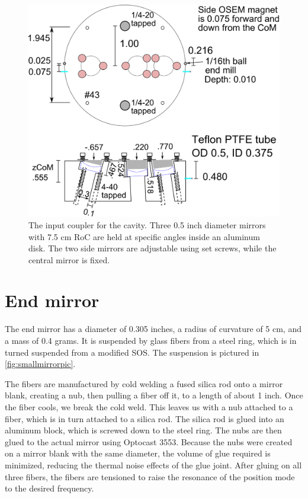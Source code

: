 \begin{figure}[hp]
	\centering
		\includegraphics[width=.9\textwidth]{figures/suspensions/inputcoupler.png}
	\caption[Input coupler]{The input coupler for the cavity. Three 0.5 inch diameter mirrors with 7.5 cm RoC are held at specific angles inside an aluminum disk. The two side mirrors are adjustable using set screws, while the central mirror is fixed.}
	\label{fig:inputcoupler}
\end{figure}
 
\section{End mirror}

The end mirror has a diameter of 0.305 inches, a radius of curvature of 5 cm, and a mass of 0.4 grams. It is suspended by glass fibers from a steel ring, which is in turned suspended from a modified SOS. The suspension is pictured in \ref{fig:smallmirrorpic}.

The fibers are manufactured by cold welding a fused silica rod onto a mirror blank, creating a nub, then pulling a fiber off it, to a length of about 1 inch. Once the fiber cools, we break the cold weld. This leaves us with a nub attached to a fiber, which is in turn attached to a silica rod. The silica rod is glued into an aluminum block, which is screwed down to the steel ring. The nubs are then glued to the actual mirror using Optocast 3553. Because the nubs were created on a mirror blank with the same diameter, the volume of glue required is minimized, reducing the thermal noise effects of the glue joint. After gluing on all three fibers, the fibers are tensioned to raise the resonance of the position mode to the desired frequency.

